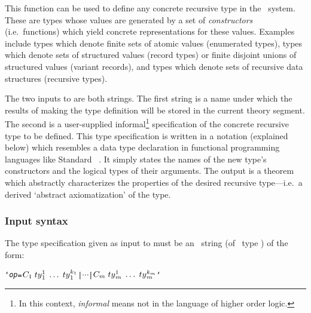 \noindent This function can be used to define any concrete recursive type in
the \HOL\ system.  These are types whose values are generated by a set of {\it
constructors\/} (i.e.\ functions) which yield concrete representations for
these values.  Examples include types which denote finite sets of atomic values
(enumerated types), types which denote sets of structured values (record types)
or finite disjoint unions of structured values (variant records), and types
which denote sets of recursive data structures (recursive types).

The two inputs to  are both strings.  The first string
is a name  under which the results of making
the type definition will be stored in the current theory segment. The second is
a user-supplied informal\footnote{ In this context, {\it informal\/} means not
in the language of higher order logic.} specification of the concrete
recursive type to be defined.  This type specification is written in
a notation (explained below) which resembles
a data type declaration in functional programming languages like Standard
\ML~\cite{sml}.  It simply states the names of the new type's
constructors and the logical types of their \mbox{arguments.}  The output is a
theorem which abstractly characterizes the properties of
the desired recursive type---i.e.\ a
derived `abstract axiomatization' of the type.

\subsubsection{Input syntax}

The type specification given as input to 
must be an \ML\ string (of \ML\ type ) of the form:

{\def\op{{\normalsize\sl op}}
\begin{hol}\begin{alltt}
   `{\op} = \(C\sb{1}\;ty{}\sb{1}\sp{1}\;\ldots\;ty{}\sb{1}\sp{k\sb{1}} \) | \(\cdots\) | \(C\sb{m}\;ty{}\sb{m}\sp{1}\;\ldots\;ty{}\sb{m}\sp{k\sb{m}}\)`
\end{alltt}\end{hol}}

